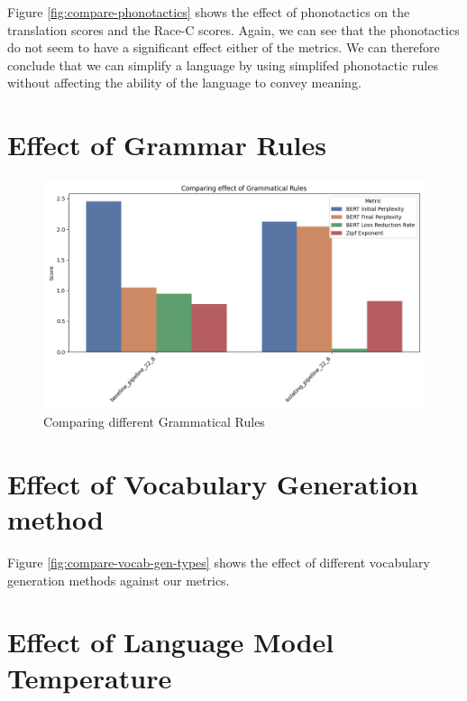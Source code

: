 Figure \ref{fig:compare-phonotactics} shows the effect of phonotactics on the translation scores and the Race-C scores. Again, we can see that
the phonotactics do not seem to have a significant effect either of the metrics. We can therefore conclude that we can simplify a language by 
using simplifed phonotactic rules without affecting the ability of the language to convey meaning.

\section{Effect of Grammar Rules}

\begin{figure}[H]  
    \centering
    \includegraphics[width=0.7\linewidth]{figures/results/1_effect_of_grammar.png}
    \caption{Comparing different Grammatical Rules}
    \label{fig:compare-grammar}
\end{figure}



\section{Effect of Vocabulary Generation method}

Figure \ref{fig:compare-vocab-gen-types} shows the effect of different vocabulary generation methods against our metrics.

\section{Effect of Language Model Temperature}
